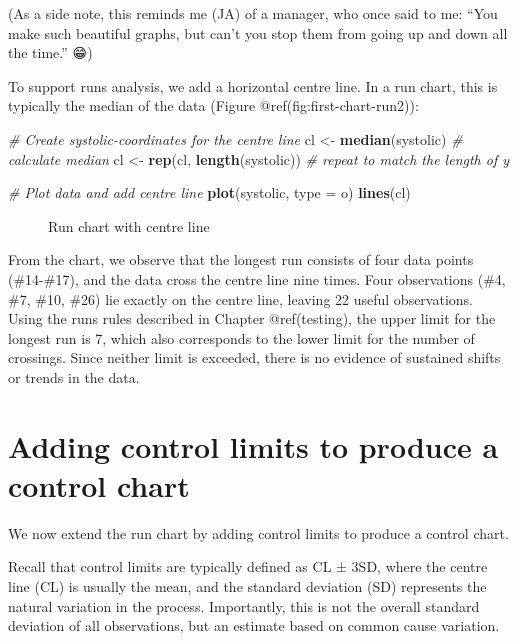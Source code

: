 \documentclass[
]{book}
\makeatletter
\newenvironment{Shaded}{\begin{snugshade}}{\end{snugshade}}
\newcommand{\AttributeTok}[1]{\textcolor[rgb]{0.13,0.29,0.53}{#1}}
\newcommand{\CommentTok}[1]{\textcolor[rgb]{0.56,0.35,0.01}{\textit{#1}}}
\newcommand{\FunctionTok}[1]{\textcolor[rgb]{0.13,0.29,0.53}{\textbf{#1}}}
\newcommand{\NormalTok}[1]{#1}
\newcommand{\OtherTok}[1]{\textcolor[rgb]{0.56,0.35,0.01}{#1}}
\newcommand{\StringTok}[1]{\textcolor[rgb]{0.31,0.60,0.02}{#1}}
\newcommand*\pandocbounded[1]{%
  \sbox\pandoc@box{#1}%
  \Gscale@div\@tempa{\textheight}{\dimexpr\ht\pandoc@box+\dp\pandoc@box\relax}%
  \Gscale@div\@tempb{\linewidth}{\wd\pandoc@box}%
  \ifdim\@tempb\p@<\@tempa\p@\let\@tempa\@tempb\fi%
  \ifdim\@tempa\p@<\p@\scalebox{\@tempa}{\usebox\pandoc@box}%
  \else\usebox{\pandoc@box}%
  \fi%
}
\makeatother
\begin{document}
(As a side note, this reminds me (JA) of a manager, who once said to me:
``You make such beautiful graphs, but can't you stop them from going up
and down all the time.'' 😁)

To support runs analysis, we add a horizontal centre line. In a run
chart, this is typically the median of the data (Figure
@ref(fig:first-chart-run2)):

\begin{Shaded}
\begin{Highlighting}[]
\CommentTok{\# Create systolic{-}coordinates for the centre line}
\NormalTok{cl  }\OtherTok{\textless{}{-}} \FunctionTok{median}\NormalTok{(systolic)           }\CommentTok{\# calculate median}
\NormalTok{cl  }\OtherTok{\textless{}{-}} \FunctionTok{rep}\NormalTok{(cl, }\FunctionTok{length}\NormalTok{(systolic))  }\CommentTok{\# repeat to match the length of y}

\CommentTok{\# Plot data and add centre line}
\FunctionTok{plot}\NormalTok{(systolic, }\AttributeTok{type =} \StringTok{\textquotesingle{}o\textquotesingle{}}\NormalTok{)}
\FunctionTok{lines}\NormalTok{(cl)}
\end{Highlighting}
\end{Shaded}

\begin{figure}
\centering
\pandocbounded{}
\caption{Run chart with centre line}
\end{figure}

From the chart, we observe that the longest run consists of four data
points (\#14-\#17), and the data cross the centre line nine times. Four
observations (\#4, \#7, \#10, \#26) lie exactly on the centre line,
leaving 22 useful observations. Using the runs rules described in
Chapter @ref(testing), the upper limit for the longest run is 7, which
also corresponds to the lower limit for the number of crossings. Since
neither limit is exceeded, there is no evidence of sustained shifts or
trends in the data.

\section{Adding control limits to produce a control
chart}\label{adding-control-limits-to-produce-a-control-chart}

We now extend the run chart by adding control limits to produce a
control chart.

Recall that control limits are typically defined as CL ± 3SD, where the
centre line (CL) is usually the mean, and the standard deviation (SD)
represents the natural variation in the process. Importantly, this is
not the overall standard deviation of all observations, but an estimate
based on common cause variation.
\end{document}

